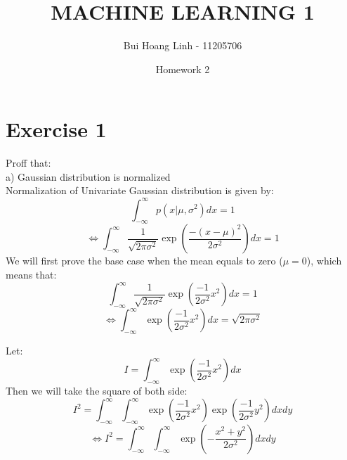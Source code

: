 \documentclass{article}
\title{MACHINE LEARNING 1}
\author{Bui Hoang Linh - 11205706}
\date{Homework 2}
\begin{document}
\maketitle


\section{Exercise 1}
Proff that:\\
a) Gaussian distribution is normalized\\
Normalization of Univariate Gaussian distribution is given by:
\[\int_{-\infty}^{\infty} p(x | \mu, \sigma^2) dx = 1\]
\[\Longleftrightarrow \int_{-\infty}^{\infty} \frac{1}{\sqrt{2 \pi \sigma^2}} \exp \left( \frac{-(x - \mu)^2}{2 \sigma^2} \right) dx = 1\]
We will first prove the base case when the mean equals to zero ($\mu = 0$), which means that:
\[\int_{-\infty}^{\infty} \frac{1}{\sqrt{2 \pi \sigma^2}} \exp \left( \frac{-1}{2 \sigma^2} x^2 \right) dx = 1\]
\[\Longleftrightarrow \int_{-\infty}^{\infty} \exp \left( \frac{-1}{2 \sigma^2} x^2 \right) dx = \sqrt{2 \pi \sigma^2}\]
     
Let:
\[I = \int_{-\infty}^{\infty} \exp \left( \frac{-1}{2 \sigma^2} x^2 \right) dx\]
Then we will take the square of both side:
\[I^2 = \int_{-\infty}^{\infty} \int_{-\infty}^{\infty} 
\exp \left( \frac{-1}{2 \sigma^2} x^2 \right) \exp \left( \frac{-1}{2 \sigma^2} y^2 \right) dx dy\]
\[\Longleftrightarrow I^2 = \int_{-\infty}^{\infty} \int_{-\infty}^{\infty}
\exp \left( -\frac{x^2 + y^2}{2 \sigma^2}\right) dx dy\]
     
\end{document}

